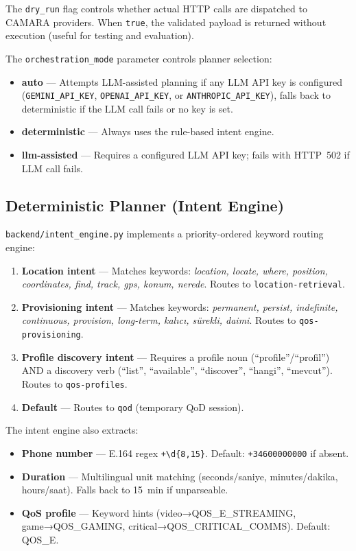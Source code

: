 \documentclass[conference]{IEEEtran}
\begin{document}
The \texttt{dry\_run} flag controls whether actual HTTP calls are dispatched
to CAMARA providers. When \texttt{true}, the validated payload is returned
without execution (useful for testing and evaluation).

The \texttt{orchestration\_mode} parameter controls planner selection:
\begin{itemize}[leftmargin=1.2em]
  \item \textbf{auto} — Attempts LLM-assisted planning if any LLM API key
        is configured (\texttt{GEMINI\_API\_KEY}, \texttt{OPENAI\_API\_KEY},
        or \texttt{ANTHROPIC\_API\_KEY}), falls back to deterministic if the
        LLM call fails or no key is set.
  \item \textbf{deterministic} — Always uses the rule-based intent engine.
  \item \textbf{llm-assisted} — Requires a configured LLM API key; fails
        with HTTP~502 if LLM call fails.
\end{itemize}

\subsection{Deterministic Planner (Intent Engine)}

\texttt{backend/intent\_engine.py} implements a priority-ordered keyword
routing engine:

\begin{enumerate}[leftmargin=1.5em]
  \item \textbf{Location intent} — Matches keywords: \textit{location, locate,
        where, position, coordinates, find, track, gps, konum, nerede}.
        Routes to \texttt{location-retrieval}.
  \item \textbf{Provisioning intent} — Matches keywords: \textit{permanent,
        persist, indefinite, continuous, provision, long-term, kalıcı,
        sürekli, daimi}. Routes to \texttt{qos-provisioning}.
  \item \textbf{Profile discovery intent} — Requires a profile noun
        (``profile''/``profil'') AND a discovery verb (``list'', ``available'',
        ``discover'', ``hangi'', ``mevcut''). Routes to \texttt{qos-profiles}.
  \item \textbf{Default} — Routes to \texttt{qod} (temporary QoD session).
\end{enumerate}

The intent engine also extracts:
\begin{itemize}[leftmargin=1.2em]
  \item \textbf{Phone number} — E.164 regex \texttt{+\textbackslash d\{8,15\}}.
        Default: \texttt{+34600000000} if absent.
  \item \textbf{Duration} — Multilingual unit matching (seconds/saniye,
        minutes/dakika, hours/saat). Falls back to 15~min if unparseable.
  \item \textbf{QoS profile} — Keyword hints (video→QOS\_E\_STREAMING,
        game→QOS\_GAMING, critical→QOS\_CRITICAL\_COMMS). Default: QOS\_E.
\end{itemize}
\end{document}
